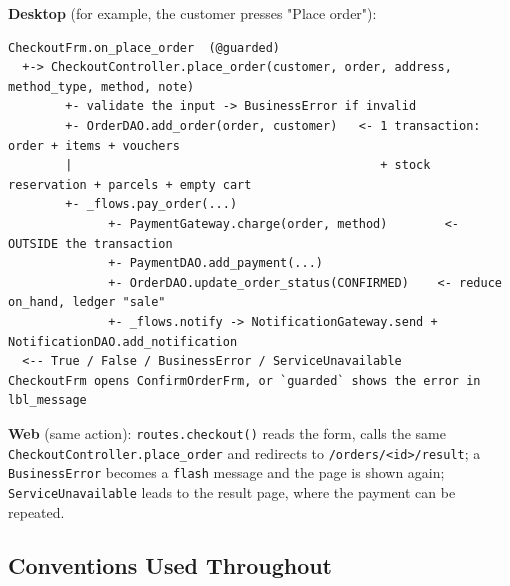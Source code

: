 \textbf{Desktop} (for example, the customer presses "Place order"):

\begin{lstlisting}[numbers=none]
CheckoutFrm.on_place_order  (@guarded)
  +-> CheckoutController.place_order(customer, order, address, method_type, method, note)
        +- validate the input -> BusinessError if invalid
        +- OrderDAO.add_order(order, customer)   <- 1 transaction: order + items + vouchers
        |                                           + stock reservation + parcels + empty cart
        +- _flows.pay_order(...)
              +- PaymentGateway.charge(order, method)        <- OUTSIDE the transaction
              +- PaymentDAO.add_payment(...)
              +- OrderDAO.update_order_status(CONFIRMED)    <- reduce on_hand, ledger "sale"
              +- _flows.notify -> NotificationGateway.send + NotificationDAO.add_notification
  <-- True / False / BusinessError / ServiceUnavailable
CheckoutFrm opens ConfirmOrderFrm, or `guarded` shows the error in lbl_message
\end{lstlisting}

\textbf{Web} (same action): \texttt{routes.\allowbreak{}checkout(\allowbreak{})} reads the form,
calls the same \texttt{CheckoutController.\allowbreak{}place\_\allowbreak{}order} and redirects to
\texttt{/\allowbreak{}orders/\allowbreak{}\textless{}id\textgreater{}\allowbreak{}/\allowbreak{}result}; a
\texttt{BusinessError} becomes a \texttt{flash} message and the page is
shown again; \texttt{ServiceUnavailable} leads to the result page, where
the payment can be repeated.

\hypertarget{conventions-used-throughout}{%
\subsection{Conventions Used
Throughout}\label{conventions-used-throughout}}

